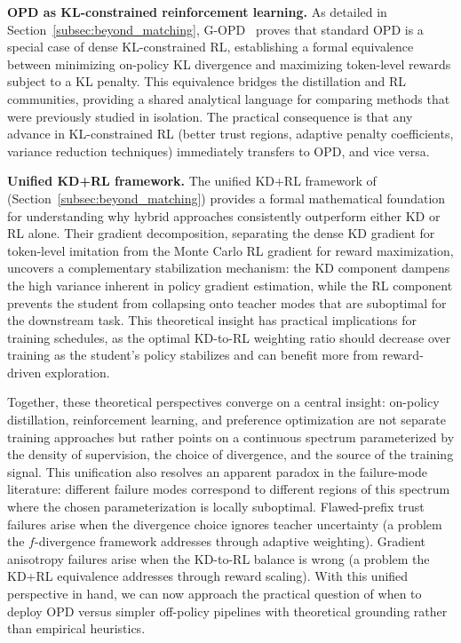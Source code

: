 \documentclass{article} %
\begin{document}
\textbf{OPD as KL-constrained reinforcement learning.}
As detailed in Section~\ref{subsec:beyond_matching}, G-OPD~\citep{2602.12125} proves that standard OPD is a special case of dense KL-constrained RL, establishing a formal equivalence between minimizing on-policy KL divergence and maximizing token-level rewards subject to a KL penalty. This equivalence bridges the distillation and RL communities, providing a shared analytical language for comparing methods that were previously studied in isolation. The practical consequence is that any advance in KL-constrained RL (better trust regions, adaptive penalty coefficients, variance reduction techniques) immediately transfers to OPD, and vice versa.

\textbf{Unified KD+RL framework.}
The unified KD+RL framework of \citet{2512.23097} (Section~\ref{subsec:beyond_matching}) provides a formal mathematical foundation for understanding why hybrid approaches consistently outperform either KD or RL alone. Their gradient decomposition, separating the dense KD gradient for token-level imitation from the Monte Carlo RL gradient for reward maximization, uncovers a complementary stabilization mechanism: the KD component dampens the high variance inherent in policy gradient estimation, while the RL component prevents the student from collapsing onto teacher modes that are suboptimal for the downstream task. This theoretical insight has practical implications for training schedules, as the optimal KD-to-RL weighting ratio should decrease over training as the student's policy stabilizes and can benefit more from reward-driven exploration.

Together, these theoretical perspectives converge on a central insight: on-policy distillation, reinforcement learning, and preference optimization are not separate training approaches but rather points on a continuous spectrum parameterized by the density of supervision, the choice of divergence, and the source of the training signal. This unification also resolves an apparent paradox in the failure-mode literature: different failure modes correspond to different regions of this spectrum where the chosen parameterization is locally suboptimal. Flawed-prefix trust failures arise when the divergence choice ignores teacher uncertainty (a problem the $f$-divergence framework addresses through adaptive weighting). Gradient anisotropy failures arise when the KD-to-RL balance is wrong (a problem the KD+RL equivalence addresses through reward scaling). With this unified perspective in hand, we can now approach the practical question of when to deploy OPD versus simpler off-policy pipelines with theoretical grounding rather than empirical heuristics.
\end{document}
